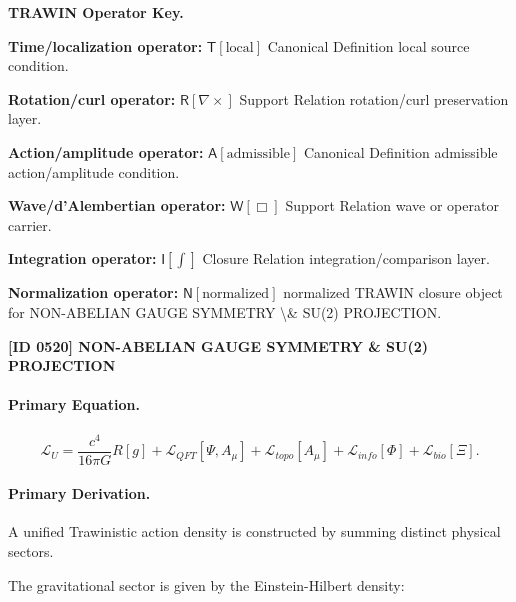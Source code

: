 \par\vspace{0.45\baselineskip}
\noindent\begin{minipage}[t]{\linewidth}
\begingroup
\small
\raggedright
\textbf{TRAWIN Operator Key.}\par
\noindent\textbf{Time/localization operator:} $\mathsf{T}\!\left[\mathrm{local}\right]$ Canonical Definition local source condition.\par
\noindent\textbf{Rotation/curl operator:} $\mathsf{R}\!\left[\nabla\times\right]$ Support Relation rotation/curl preservation layer.\par
\noindent\textbf{Action/amplitude operator:} $\mathsf{A}\!\left[\mathrm{admissible}\right]$ Canonical Definition admissible action/amplitude condition.\par
\noindent\textbf{Wave/d'Alembertian operator:} $\mathsf{W}\!\left[\Box\right]$ Support Relation wave or operator carrier.\par
\noindent\textbf{Integration operator:} $\mathsf{I}\!\left[\int\right]$ Closure Relation integration/comparison layer.\par
\noindent\textbf{Normalization operator:} $\mathsf{N}\!\left[\mathrm{normalized}\right]$ normalized TRAWIN closure object for NON-ABELIAN GAUGE SYMMETRY \textbackslash{}\& SU(2) PROJECTION.\par
\endgroup
\end{minipage}

\clearpage
\noindent\textbf{[ID 0520] NON-ABELIAN GAUGE SYMMETRY \& SU(2) PROJECTION}\par
\vspace{0.35em}
\paragraph{Primary Equation.}
\begin{equation}
\mathcal{L}_U
=
\frac{c^4}{16\pi G}R[g]
+
\mathcal{L}_{QFT}[\Psi,A_\mu]
+
\mathcal{L}_{topo}[A_\mu]
+
\mathcal{L}_{info}[\Phi]
+
\mathcal{L}_{bio}[\Xi].
\end{equation}

\paragraph{Primary Derivation.}
A unified Trawinistic action density is constructed by summing distinct physical sectors.

The gravitational sector is given by the Einstein-Hilbert density:

